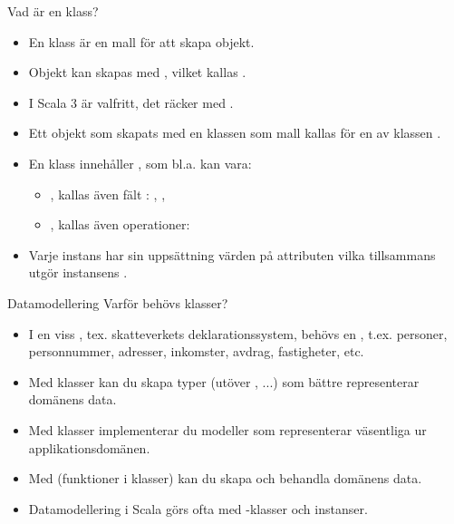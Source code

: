 \begin{Slide}{Vad är en klass?}
\begin{itemize}
\item En klass är en mall  för att skapa objekt.
\item Objekt kan skapas med , vilket kallas . 
\item I Scala 3 är  valfritt, det räcker med . 
\item Ett objekt som skapats med en klassen  som mall kallas för en  av klassen .
\item En klass innehåller  , som bl.a. kan vara:
  \begin{itemize}
  \item {}, kallas även fält : , , 
  \item {}, kallas även operationer: 
  \end{itemize}
\item Varje instans har sin uppsättning värden på attributen
vilka tillsammans utgör instansens .
\end{itemize}

\end{Slide}
  

\begin{Slide}{Datamodellering}
Varför behövs klasser? 
\begin{itemize}
\item I en viss  , tex. skatteverkets deklarationssystem, behövs en , t.ex. personer, personnummer, adresser, inkomster, avdrag, fastigheter, etc.
\item Med klasser kan du skapa  typer (utöver ,  ...) som bättre representerar domänens data.
\item Med klasser implementerar du modeller som representerar väsentliga  ur applikationsdomänen. 
\item Med  (funktioner i klasser) kan du skapa och behandla domänens data.
\item Datamodellering i Scala görs ofta med -klasser och  instanser.
\end{itemize}
\end{Slide}

